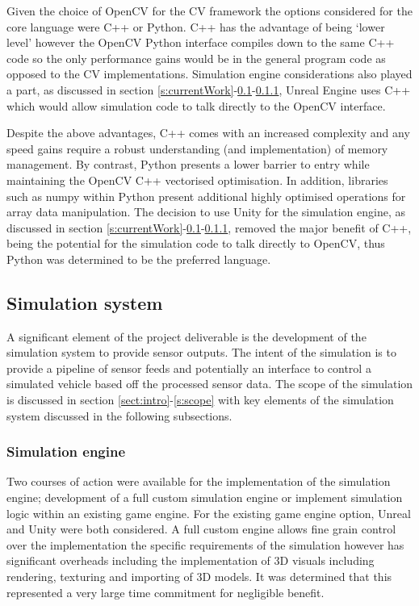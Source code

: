 \documentclass[]{aiaa-tc}%
\begin{document}
Given the choice of OpenCV for the CV framework the options considered for the core language were C++ or Python. C++ has the advantage of being `lower level' however the OpenCV Python interface compiles down to the same C++ code so the only performance gains would be in the general program code as opposed to the CV implementations. Simulation engine considerations also played a part, as discussed in section \ref{s:currentWork}-\ref{s:simSystem}-\ref{s:simEngineChoice}, Unreal Engine uses C++ which would allow simulation code to talk directly to the OpenCV interface.

Despite the above advantages, C++ comes with an increased complexity and any speed gains require a robust understanding (and implementation) of memory management. By contrast, Python presents a lower barrier to entry while maintaining the OpenCV C++ vectorised optimisation. In addition, libraries such as numpy within Python present additional highly optimised operations for array data manipulation. The decision to use Unity for the simulation engine, as discussed in section \ref{s:currentWork}-\ref{s:simSystem}-\ref{s:simEngineChoice}, removed the major benefit of C++, being the potential for the simulation code to talk directly to OpenCV, thus Python was determined to be the preferred language.

\subsection{Simulation system}\label{s:simSystem}

A significant element of the project deliverable is the development of the simulation system to provide sensor outputs. The intent of the simulation is to provide a pipeline of sensor feeds and potentially an interface to control a simulated vehicle based off the processed sensor data. The scope of the simulation is discussed in section \ref{sect:intro}-\ref{s:scope} with key elements of the simulation system discussed in the following subsections.


\subsubsection{Simulation engine} \label{s:simEngineChoice}

Two courses of action were available for the implementation of the simulation engine; development of a full custom simulation engine or implement simulation logic within an existing game engine. For the existing game engine option, Unreal and Unity were both considered. A full custom engine allows fine grain control over the implementation the specific requirements of the simulation however has significant overheads including the implementation of 3D visuals including rendering, texturing and importing of 3D models. It was determined that this represented a very large time commitment for negligible benefit.
\end{document}

